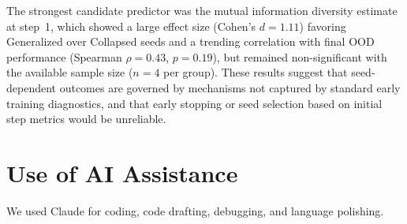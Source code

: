 The strongest candidate predictor was the mutual information diversity estimate at step~1, which showed a large effect size (Cohen's $d = 1.11$) favoring Generalized over Collapsed seeds and a trending correlation with final OOD performance (Spearman $\rho = 0.43$, $p = 0.19$), but remained non-significant with the available sample size ($n = 4$ per group). These results suggest that seed-dependent outcomes are governed by mechanisms not captured by standard early training diagnostics, and that early stopping or seed selection based on initial step metrics would be unreliable.

\section{Use of AI Assistance}
We used Claude for coding, code drafting, debugging, and language polishing.
